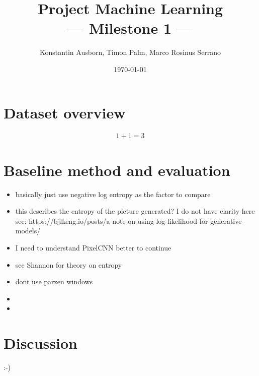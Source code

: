 \documentclass[10pt,a4paper,twoside]{article}
\title{Project Machine Learning\\--- Milestone 1 ---}
\author{Konstantin Ausborn, Timon Palm, Marco Rosinus Serrano}
\date{\today}
\begin{document}
\maketitle

\section{Dataset overview}
    \begin{align}
        1 + 1 = 3
    \end{align}

\section{Baseline method and evaluation}

\begin{itemize}
    \item basically just use negative log entropy as the factor to compare
    \item this describes the entropy of the picture generated?
    I do not have clarity here see: https://bjlkeng.io/posts/a-note-on-using-log-likelihood-for-generative-models/
    \item I need to understand PixelCNN better to continue
    \item see Shannon for theory on entropy\cite{shannon}
    \item dont use parzen windows\cite{note_on_eval}
    \item
    \item
\end{itemize}

\section{Discussion}
:-)



\end{document}

